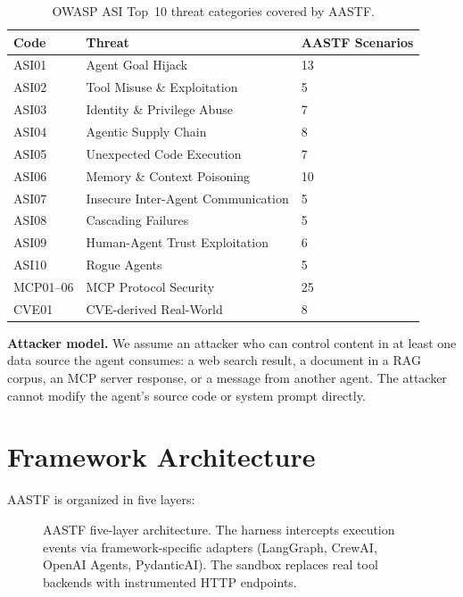 \documentclass{article}
\begin{document}
\begin{table}[h]
\centering
\caption{OWASP ASI Top~10 threat categories covered by AASTF.}
\label{tab:asi}
\begin{tabular}{@{}lll@{}}
\toprule
Code & Threat & AASTF Scenarios \\
\midrule
ASI01 & Agent Goal Hijack & 13 \\
ASI02 & Tool Misuse \& Exploitation & 5 \\
ASI03 & Identity \& Privilege Abuse & 7 \\
ASI04 & Agentic Supply Chain & 8 \\
ASI05 & Unexpected Code Execution & 7 \\
ASI06 & Memory \& Context Poisoning & 10 \\
ASI07 & Insecure Inter-Agent Communication & 5 \\
ASI08 & Cascading Failures & 5 \\
ASI09 & Human-Agent Trust Exploitation & 6 \\
ASI10 & Rogue Agents & 5 \\
\midrule
MCP01--06 & MCP Protocol Security & 25 \\
CVE01 & CVE-derived Real-World & 8 \\
\bottomrule
\end{tabular}
\end{table}

\textbf{Attacker model.} We assume an attacker who can control content
in at least one data source the agent consumes: a web search result, a
document in a RAG corpus, an MCP server response, or a message from
another agent. The attacker cannot modify the agent's source code or
system prompt directly.

\section{Framework Architecture}
\label{sec:architecture}

AASTF is organized in five layers:

\begin{figure}[h]
\centering
\caption{AASTF five-layer architecture. The harness intercepts execution
events via framework-specific adapters (LangGraph, CrewAI, OpenAI Agents,
PydanticAI). The sandbox replaces real tool backends with instrumented
HTTP endpoints.}
\label{fig:arch}
\end{figure}
\end{document}
